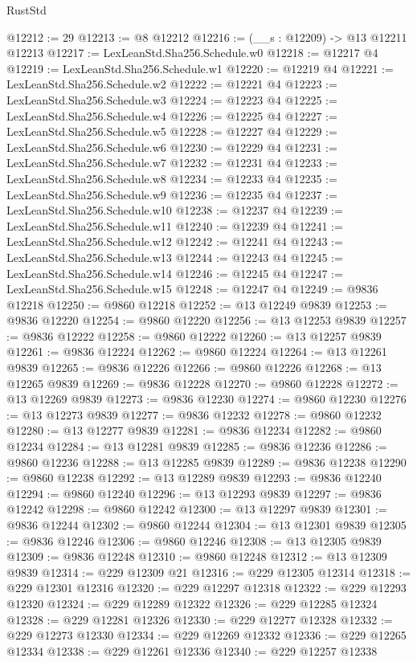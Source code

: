 \begin{lexlean}{RustStd}
\begin{coremodule}
@12212 := 29
@12213 := @8 @12212
@12216 := (__s : @12209) -> @13 @12211 @12213
@12217 := LexLeanStd.Sha256.Schedule.w0
@12218 := @12217 @4
@12219 := LexLeanStd.Sha256.Schedule.w1
@12220 := @12219 @4
@12221 := LexLeanStd.Sha256.Schedule.w2
@12222 := @12221 @4
@12223 := LexLeanStd.Sha256.Schedule.w3
@12224 := @12223 @4
@12225 := LexLeanStd.Sha256.Schedule.w4
@12226 := @12225 @4
@12227 := LexLeanStd.Sha256.Schedule.w5
@12228 := @12227 @4
@12229 := LexLeanStd.Sha256.Schedule.w6
@12230 := @12229 @4
@12231 := LexLeanStd.Sha256.Schedule.w7
@12232 := @12231 @4
@12233 := LexLeanStd.Sha256.Schedule.w8
@12234 := @12233 @4
@12235 := LexLeanStd.Sha256.Schedule.w9
@12236 := @12235 @4
@12237 := LexLeanStd.Sha256.Schedule.w10
@12238 := @12237 @4
@12239 := LexLeanStd.Sha256.Schedule.w11
@12240 := @12239 @4
@12241 := LexLeanStd.Sha256.Schedule.w12
@12242 := @12241 @4
@12243 := LexLeanStd.Sha256.Schedule.w13
@12244 := @12243 @4
@12245 := LexLeanStd.Sha256.Schedule.w14
@12246 := @12245 @4
@12247 := LexLeanStd.Sha256.Schedule.w15
@12248 := @12247 @4
@12249 := @9836 @12218
@12250 := @9860 @12218
@12252 := @13 @12249 @9839
@12253 := @9836 @12220
@12254 := @9860 @12220
@12256 := @13 @12253 @9839
@12257 := @9836 @12222
@12258 := @9860 @12222
@12260 := @13 @12257 @9839
@12261 := @9836 @12224
@12262 := @9860 @12224
@12264 := @13 @12261 @9839
@12265 := @9836 @12226
@12266 := @9860 @12226
@12268 := @13 @12265 @9839
@12269 := @9836 @12228
@12270 := @9860 @12228
@12272 := @13 @12269 @9839
@12273 := @9836 @12230
@12274 := @9860 @12230
@12276 := @13 @12273 @9839
@12277 := @9836 @12232
@12278 := @9860 @12232
@12280 := @13 @12277 @9839
@12281 := @9836 @12234
@12282 := @9860 @12234
@12284 := @13 @12281 @9839
@12285 := @9836 @12236
@12286 := @9860 @12236
@12288 := @13 @12285 @9839
@12289 := @9836 @12238
@12290 := @9860 @12238
@12292 := @13 @12289 @9839
@12293 := @9836 @12240
@12294 := @9860 @12240
@12296 := @13 @12293 @9839
@12297 := @9836 @12242
@12298 := @9860 @12242
@12300 := @13 @12297 @9839
@12301 := @9836 @12244
@12302 := @9860 @12244
@12304 := @13 @12301 @9839
@12305 := @9836 @12246
@12306 := @9860 @12246
@12308 := @13 @12305 @9839
@12309 := @9836 @12248
@12310 := @9860 @12248
@12312 := @13 @12309 @9839
@12314 := @229 @12309 @21
@12316 := @229 @12305 @12314
@12318 := @229 @12301 @12316
@12320 := @229 @12297 @12318
@12322 := @229 @12293 @12320
@12324 := @229 @12289 @12322
@12326 := @229 @12285 @12324
@12328 := @229 @12281 @12326
@12330 := @229 @12277 @12328
@12332 := @229 @12273 @12330
@12334 := @229 @12269 @12332
@12336 := @229 @12265 @12334
@12338 := @229 @12261 @12336
@12340 := @229 @12257 @12338

\end{coremodule}
\end{lexlean}
